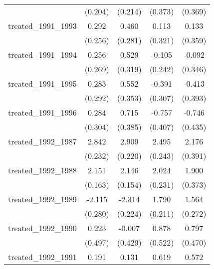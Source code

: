 {\begin{tabular}{l*{4}{c}}
            &     (0.204)         &     (0.214)         &     (0.373)         &     (0.369)         \\
[1em]
treated\_1991\_1993&       0.292         &       0.460         &       0.113         &       0.133         \\
            &     (0.256)         &     (0.281)         &     (0.321)         &     (0.359)         \\
[1em]
treated\_1991\_1994&       0.256         &       0.529         &      -0.105         &      -0.092         \\
            &     (0.269)         &     (0.319)         &     (0.242)         &     (0.346)         \\
[1em]
treated\_1991\_1995&       0.283         &       0.552         &      -0.391         &      -0.413         \\
            &     (0.292)         &     (0.353)         &     (0.307)         &     (0.393)         \\
[1em]
treated\_1991\_1996&       0.284         &       0.715         &      -0.757         &      -0.746         \\
            &     (0.304)         &     (0.385)         &     (0.407)         &     (0.435)         \\
[1em]
treated\_1992\_1987&       2.842\sym{***}&       2.909\sym{***}&       2.495\sym{***}&       2.176\sym{***}\\
            &     (0.232)         &     (0.220)         &     (0.243)         &     (0.391)         \\
[1em]
treated\_1992\_1988&       2.151\sym{***}&       2.146\sym{***}&       2.024\sym{***}&       1.900\sym{***}\\
            &     (0.163)         &     (0.154)         &     (0.231)         &     (0.373)         \\
[1em]
treated\_1992\_1989&      -2.115\sym{***}&      -2.314\sym{***}&       1.790\sym{***}&       1.564\sym{***}\\
            &     (0.280)         &     (0.224)         &     (0.211)         &     (0.272)         \\
[1em]
treated\_1992\_1990&       0.223         &      -0.007         &       0.878         &       0.797         \\
            &     (0.497)         &     (0.429)         &     (0.522)         &     (0.470)         \\
[1em]
treated\_1992\_1991&       0.191         &       0.131         &       0.619\sym{**} &       0.572\sym{*}  \\

\end{tabular}}
